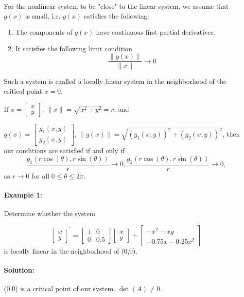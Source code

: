 \documentclass[letterpaper,12pt]{article}
\begin{document}
For the nonlinear system to be "close" to the linear system, we assume that $g(x)$ is small, i.e. $g(x)$ 
satisfies the following:
\begin{enumerate}
    \item The components of $g(x)$ have continuous first partial derivatives.
    \item It satisfies the following limit condition
        $$ \frac{\lVert g(x) \rVert}{\lVert x \rVert} \to 0$$
\end{enumerate}


Such a system is caalled a locally linear system in the neighborhood of the critical point
$x = 0$.


If $x = \begin{bmatrix}
    x\\y
\end{bmatrix}$, $\lVert x \rVert = \sqrt{x^2 + y^2} = r$, and


$g(x) = \begin{bmatrix}
    g_1(x,y)\\g_2(x,y)
\end{bmatrix}$, $\lVert g(x) \rVert = \sqrt{(g_1(x,y))^2 + (g_2(x,y))^2}$, then our conditions
are satisfied if and only if 
\[
    \frac{g_1(r\cos(\theta), r\sin(\theta))}{r} \to 0, 
    \frac{g_2(r\cos(\theta), r\sin(\theta))}{r} \to 0, 
\]
as $r\to 0$ for all $0 \leq \theta \leq 2\pi$.


\paragraph{Example 1:} Determine whether the system

\[
    \begin{bmatrix}
        x\\y
    \end{bmatrix}^{\prime}
    =
    \begin{bmatrix}
        1 & 0\\
        0 & 0.5
    \end{bmatrix}
    \begin{bmatrix}
        x\\y
    \end{bmatrix}
    +
    \begin{bmatrix}
        -x^2 - xy \\
        -0.75x - 0.25x^2
    \end{bmatrix}
\]
is locally linear in the neighborhood of (0,0).

\paragraph{Solution:}(0,0) is a critical point of our system. $\det(A) \ne 0$.
\end{document}
